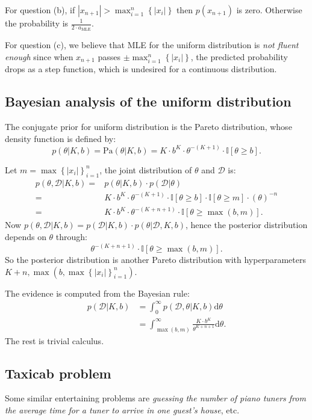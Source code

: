 \documentclass[UTF8]{ctexart}
\begin{document}
For question (b), if $|x_{n+1}| > \max_{i=1}^{n}\left\{ |x_{i}| \right\}$ then $p(x_{n+1})$ is zero.
Otherwise the probability is $\frac{1}{2\cdot a_{\text{MLE}}}$.

For question (c), we believe that MLE for the uniform distribution is \emph{not fluent enough} since when $x_{n+1}$ passes $\pm\max_{i=1}^{n}\left\{ |x_{i}| \right\}$, the predicted probability drops as a step function, which is undesired for a continuous distribution.


\subsection{Bayesian analysis of the uniform distribution}
The conjugate prior for uniform distribution is the Pareto distribution, whose density function is defined by:
$$p(\theta|K,b)=\text{Pa}(\theta|K,b)=K\cdot b^{K}\cdot\theta^{-(K+1)}\cdot\mathbb{I}[\theta \geq b].$$

Let $m=\max\left\{|x_{i}|\right\}_{i=1}^{n}$, the joint distribution of $\theta$ and $\mathcal{D}$ is:
$$
\begin{aligned}
p(\theta,\mathcal{D}|K,b) =& p(\theta|K,b)\cdot p(\mathcal{D}|\theta)\\
=& K\cdot b^{K}\cdot \theta^{-(K+1)}\cdot \mathbb{I}[\theta \geq b]\cdot\mathbb{I}[\theta \geq m]\cdot (\theta)^{-n}\\
=&K\cdot b^{K}\cdot\theta^{-(K+n+1)}\cdot\mathbb{I}[\theta\geq \max(b,m)].
\end{aligned}
$$
Now $p(\theta,\mathcal{D}|K,b)=p(\mathcal{D}|K,b)\cdot p(\theta|\mathcal{D},K,b)$, hence the posterior distribution depends on $\theta$ through:
$$\theta^{-(K+n+1)}\cdot\mathbb{I}[\theta\geq \max(b,m)].$$
So the posterior distribution is another Pareto distribution with hyperparameters $K+n,\max(b,\max\left\{|x_{i}|\right\}_{i=1}^{n})$.

The evidence is computed from the Bayesian rule:
$$
\begin{aligned}
p(\mathcal{D}|K,b)&=\int_{0}^{\infty} p(\mathcal{D},\theta|K,b) \text{d}\theta\\
&=\int_{\max(b,m)}^{\infty}\frac{K\cdot b^{K}}{\theta^{K+n+1}}\text{d}\theta.
\end{aligned}
$$
The rest is trivial calculus.


\subsection{Taxicab problem}
Some similar entertaining problems are \emph{guessing the number of piano tuners from the average time for a tuner to arrive in one guest's house}, etc.
\end{document}

